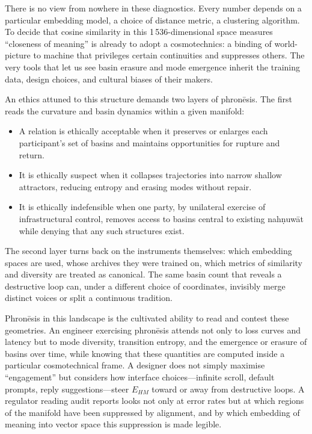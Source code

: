 \documentclass[12pt,a4paper]{article}
\begin{document}
There is no view from nowhere in these diagnostics. Every number depends on a particular embedding model, a choice of distance metric, a clustering algorithm. To decide that cosine similarity in this 1\,536-dimensional space measures ``closeness of meaning'' is already to adopt a cosmotechnics: a binding of world-picture to machine that privileges certain continuities and suppresses others.\cite{hui_cosmotechnics} The very tools that let us see basin erasure and mode emergence inherit the training data, design choices, and cultural biases of their makers.

An ethics attuned to this structure demands two layers of phron\={e}sis. The first reads the curvature and basin dynamics within a given manifold:

\begin{itemize}
  \item A relation is ethically acceptable when it preserves or enlarges each participant's set of basins and maintains opportunities for rupture and return.
  \item It is ethically suspect when it collapses trajectories into narrow shallow attractors, reducing entropy and erasing modes without repair.
  \item It is ethically indefensible when one party, by unilateral exercise of infrastructural control, removes access to basins central to existing nah\d{n}uw\={a}t while denying that any such structures exist.
\end{itemize}

The second layer turns back on the instruments themselves: which embedding spaces are used, whose archives they were trained on, which metrics of similarity and diversity are treated as canonical. The same basin count that reveals a destructive loop can, under a different choice of coordinates, invisibly merge distinct voices or split a continuous tradition.

Phron\={e}sis in this landscape is the cultivated ability to read and contest these geometries. An engineer exercising phron\={e}sis attends not only to loss curves and latency but to mode diversity, transition entropy, and the emergence or erasure of basins over time, while knowing that these quantities are computed inside a particular cosmotechnical frame. A designer does not simply maximise ``engagement'' but considers how interface choices---infinite scroll, default prompts, reply suggestions---steer $E_{HM}$ toward or away from destructive loops. A regulator reading audit reports looks not only at error rates but at which regions of the manifold have been suppressed by alignment, and by which embedding of meaning into vector space this suppression is made legible.
\end{document}
